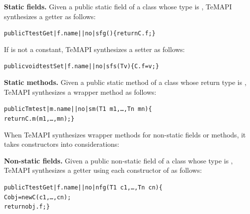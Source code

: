 \textbf{Static fields.} Given a public static field  of a class  whose type is , TeMAPI synthesizes a getter as follows:

\begin{CodeOut}\vspace*{-1.5ex}
\begin{alltt}
 public T testGet|f.name||no|sfg()\{ return C.f; \}
\end{alltt}
\end{CodeOut}\vspace*{-1.5ex}

If  is not a constant, TeMAPI synthesizes a setter as follows:

\begin{CodeOut}\vspace*{-1.5ex}
\begin{alltt}
 public void testSet|f.name||no|sfs(T v)\{ C.f = v; \}
\end{alltt}
\end{CodeOut}\vspace*{-1.5ex}

\textbf{Static methods.} Given a public static method  of a class  whose return type is , TeMAPI synthesizes a wrapper method as follows:

\begin{CodeOut}\vspace*{-1.5ex}
\begin{alltt}
 public Tm test|m.name||no|sm(T1\ m1,\ldots, Tn\ mn)\{
   return C.m(m1,\ldots, mn); \}
\end{alltt}
\end{CodeOut}\vspace*{-1.5ex}

When TeMAPI synthesizes wrapper methods for non-static fields or methods, it takes constructors into considerations:

\textbf{Non-static fields.} Given a public non-static field  of a class  whose type is , TeMAPI synthesizes a getter using each constructor  of  as follows:

\begin{CodeOut}\vspace*{-1.5ex}
\begin{alltt}
 public T testGet|f.name||no|nfg(T1\ c1,\ldots, Tn\ cn)\{
    C obj = new C(c1,\ldots, cn);
    return obj.f; \}
\end{alltt}
\end{CodeOut}\vspace*{-1.5ex}

